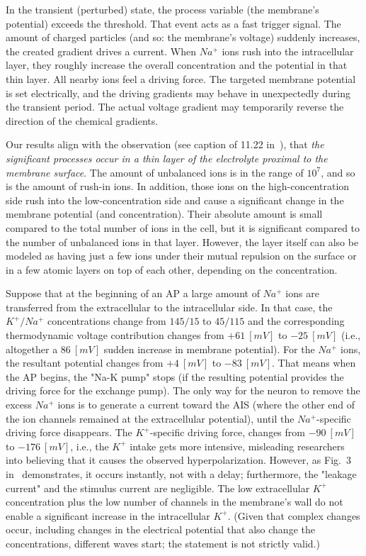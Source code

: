In the transient (perturbed) state, the process variable
(the membrane's potential) exceeds the threshold. That event acts
as a fast trigger signal. The amount of charged particles (and so:
the membrane's voltage) suddenly increases, the created gradient
drives a current.
When $Na^+$ ions rush into the intracellular layer, they roughly increase the overall concentration and the potential in that thin layer.
All nearby ions feel a driving force. The targeted membrane potential is set electrically,
and the driving gradients may behave in unexpectedly during the transient period.
The actual voltage gradient may temporarily reverse the direction of the chemical gradients.

Our results align with the observation (see caption of 11.22 in~\cite{MolecularBiology:2002}), that \textit{the significant processes
	occur in a thin layer of the electrolyte proximal to the membrane surface}.
The amount of unbalanced ions is in the range of $10^7$,
and so is the amount of rush-in ions. In addition, those 
ions on the high-concentration side rush into the 
low-concentration side and cause a significant change in the 
membrane potential (and concentration). Their absolute amount is small compared to the total number of ions in the cell,
but it is significant compared to the number of unbalanced ions in that layer.
However, the layer itself can also be modeled
as having just a few ions under their mutual repulsion on the surface
or in a few atomic layers on top of each other, depending on the concentration.



Suppose that at the beginning of an \gls{AP} a large amount of $Na^+$ ions are transferred from the extracellular to the intracellular side. In that case,  the $K^+/Na^+$ concentrations change from $145/15$ to $45/115$ and the 
corresponding thermodynamic voltage contribution changes from $+61\ [mV]$ to $-25\ [mV]$ (i.e., altogether a $86\ [mV]$ sudden increase in membrane potential). For the $Na^+$ ions, the resultant potential changes from $+4\ [mV]$ to $-83\ [mV]$. That means when the \gls{AP} begins, the "Na-K pump" stops (if the resulting potential provides the driving force for the exchange pump). The only way for the neuron to remove the excess  $Na^+$ ions is to generate a current toward the \gls{AIS} (where the other end of the ion channels remained at the extracellular potential), until the $Na^+$-specific driving force disappears. The $K^+$-specific driving force, changes from $-90\ [mV]$ to  $-176\ [mV]$, i.e., the $K^+$
intake gets more intensive, misleading researchers into believing that it causes
the observed hyperpolarization. However, as  Fig.~3 in~\cite{NeuralEnergyConsumption:2017} demonstrates, it occurs instantly, not with a delay; furthermore, the "leakage current" and the stimulus current are negligible. The low extracellular $K^+$ concentration plus the 
low number of channels in the membrane's wall
do not enable a significant increase in the intracellular $K^+$. 
(Given that complex changes occur, including changes in the electrical potential that also change the concentrations, different waves start; the statement is not strictly valid.)


